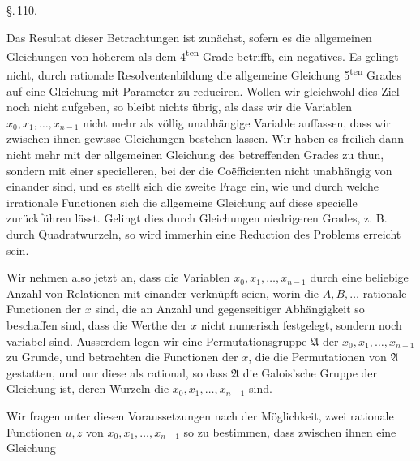 \begin{center}
\S.\,110.

\end{center}

Das Resultat dieser Betrachtungen ist zunächst, sofern es die allgemeinen
Gleichungen von höherem als dem 4\textsuperscript{ten} Grade betrifft,
ein negatives. Es gelingt nicht, durch rationale Resolventenbildung die
allgemeine Gleichung 5\textsuperscript{ten} Grades auf eine Gleichung mit
 Parameter zu reduciren. Wollen wir gleichwohl dies Ziel noch nicht
aufgeben, so bleibt nichts übrig, als dass wir die Variablen
$x_0, x_1, \ldots, x_{n-1}$ nicht mehr als völlig unabhängige Variable
auffassen, dass wir zwischen ihnen gewisse Gleichungen bestehen lassen.
Wir haben es freilich dann nicht mehr mit der allgemeinen Gleichung des
betreffenden Grades zu thun, sondern mit einer specielleren, bei der die
Co\"efficienten nicht unabhängig von einander sind, und es stellt sich
die zweite Frage ein, wie und durch welche irrationale Functionen sich
die allgemeine Gleichung auf diese specielle zurückführen lässt. Gelingt
dies durch Gleichungen niedrigeren Grades, z. B. durch Quadratwurzeln, so
wird immerhin eine Reduction des Problems erreicht sein.

Wir nehmen also jetzt an, dass die Variablen $x_0, x_1, \ldots, x_{n-1}$
durch eine beliebige Anzahl von Relationen
mit einander verknüpft seien, worin die $A, B, \ldots$ rationale
Functionen der $x$ sind, die an Anzahl und gegenseitiger Abhängigkeit so
beschaffen sind, dass die Werthe der $x$ nicht numerisch festgelegt,
sondern noch variabel sind. Ausserdem legen wir eine Permutationsgruppe
$\mathfrak{A}$ der $x_0, x_1, \ldots, x_{n-1}$ zu Grunde, und betrachten
die Functionen der $x$, die die Permutationen von $\mathfrak{A}$
gestatten, und nur diese als rational, so dass $\mathfrak{A}$ die
Galois'sche Gruppe der Gleichung ist, deren Wurzeln die
$x_0, x_1, \ldots, x_{n-1}$ sind. 

Wir fragen unter diesen Voraussetzungen nach der Möglichkeit, zwei
rationale Functionen $u, z$ von $x_0, x_1, \ldots, x_{n-1}$ so zu
bestimmen, dass zwischen ihnen eine Gleichung

